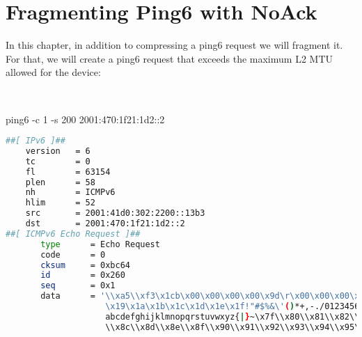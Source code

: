 \chapter{Fragmenting Ping6 with NoAck}

In this chapter, in addition to compressing a ping6 request we will fragment it.
For that, we will create a ping6 request that exceeds the maximum L2 MTU allowed for the device:

~

\begin{termc}[backgroundcolor=\color{gray!10}, basicstyle=\ttfamily\small, escapechar=@]
ping6 -c 1 -s 200 2001:470:1f21:1d2::2
\end{termc}

\begin{lstlisting}[language=bash, basicstyle=\ttfamily\tiny, showstringspaces=false]
##[ IPv6 ]##
    version   = 6
    tc        = 0
    fl        = 63154
    plen      = 58
    nh        = ICMPv6
    hlim      = 52
    src       = 2001:41d0:302:2200::13b3
    dst       = 2001:470:1f21:1d2::2
##[ ICMPv6 Echo Request ]##
       type      = Echo Request
       code      = 0
       cksum     = 0xbc64
       id        = 0x260
       seq       = 0x1
       data      = '\\xa5\\xf3\x1cb\x00\x00\x00\x00\x9d\r\x00\x00\x00\x00\x00\x10\x1 1\x12\x13\x14\x15\x16\x17\x18
                    \x19\x1a\x1b\x1c\x1d\x1e\x1f!"#$%&\'()*+,-./0123456789:;<=>?@ABCDEFGHIJKLMNOPQRSTUVWXYZ[\\]^_`
                    abcdefghijklmnopqrstuvwxyz{|}~\x7f\\x80\\x81\\x82\\x83\\x84\\x85\\x86\\x87\\x88\\x89\\x8a\\x8b
                    \\x8c\\x8d\\x8e\\x8f\\x90\\x91\\x92\\x93\\x94\\x95\\x96\\x97\\x98\\x99\\x9a\\x9b\\x9c\\x9d\\x9e

\end{lstlisting}
